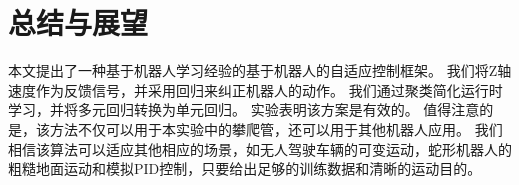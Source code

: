
\chapter{总结与展望}
本文提出了一种基于机器人学习经验的基于机器人的自适应控制框架。 我们将Z轴速度作为反馈信号，并采用回归来纠正机器人的动作。 我们通过聚类简化运行时学习，并将多元回归转换为单元回归。 实验表明该方案是有效的。 值得注意的是，该方法不仅可以用于本实验中的攀爬管，还可以用于其他机器人应用。 我们相信该算法可以适应其他相应的场景，如无人驾驶车辆的可变运动，蛇形机器人的粗糙地面运动和模拟PID控制，只要给出足够的训练数据和清晰的运动目的。